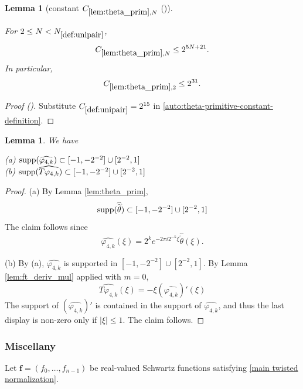 \documentclass[12pt,reqno]{amsart}
\newcommand{\auto}{{({\tiny\faCar})}}
\theoremstyle{plain}
\newtheorem{lemma}[theorem]{Lemma}
\numberwithin{equation}{section}
\theoremstyle{remark}
\newcommand{\uses}[1]{}
\newcommand{\usesdefs}[1]{}
\newcommand{\leanok}{}
\newcommand{\lean}[1]{}
\begin{document}
\begin{lemma}[constant $C_{\ref{lem:theta_prim},N}$ \auto]\label{constant theta primitive}\uses{lem:theta_prim}\usesdefs{def:unipair}
\lean{Auto.constantThetaPrimitive}
\leanok
For $2\le N<N_{\ref{def:unipair}}$,
\begin{equation}\label{constant theta primitive bound}
C_{\ref{lem:theta_prim},N}\le2^{5N+21}.
\end{equation}
In particular,
\begin{equation}\label{auto:constant-theta-primitive-two}
C_{\ref{lem:theta_prim},2}\le2^{31}.
\end{equation}
\end{lemma}
\begin{proof}[Proof \auto]
Substitute $C_{\ref{def:unipair}}=2^{15}$ in \eqref{auto:theta-primitive-constant-definition}.
\end{proof}

\begin{lemma}\label{lem:phi4_supp}\uses{lem:theta_prim,lem:ft_deriv_mul}\usesdefs{defn:window based bump functions} We have
\lean{Auto.phiFourSupport}
\leanok
(a) $\textup{supp}(\widehat{\varphi_{4,k}})
\subset  [-1,-2^{-2}]\cup [2^{-2},1]$\\

(b) $\textup{supp}(\widehat{T\varphi_{4,k}})
\subset  [-1,-2^{-2}]\cup [2^{-2},1]$
\end{lemma}
\begin{proof}
(a) By Lemma \ref{lem:theta_prim},
\[\textup{supp}(\widehat{\widetilde{\theta}}) \subset [-1,-2^{-2}]\cup [2^{-2},1]\]
The claim follows since
\[\widehat{\varphi_{4,k}}(\xi)=2^ke^{-2\pi i2^{-k}\xi}\widehat{\widetilde\theta}(\xi).  \]

(b) By (a), $\widehat{\varphi_{4,k}}$ is supported in
$ [-1,-2^{-2}]\cup [2^{-2},1] $.
  By Lemma \ref{lem:ft_deriv_mul} applied with $m=0$,
  \[\widehat{T\varphi_{4,k}}(\xi) = -\xi(\widehat{\varphi_{4,k}})'(\xi) \]
The support of $(\widehat{\varphi_{4,k}})'$ is contained in the support of $\widehat{\varphi_{4,k}}$, and thus the last display is non-zero only if  $|\xi|\le 1$. The claim follows.
\end{proof}

\subsubsection{Miscellany}
Let $\mathbf{f}=(f_0,\dots,f_{n-1})$ be real-valued Schwartz functions satisfying \eqref{main twisted normalization}.
\end{document}
